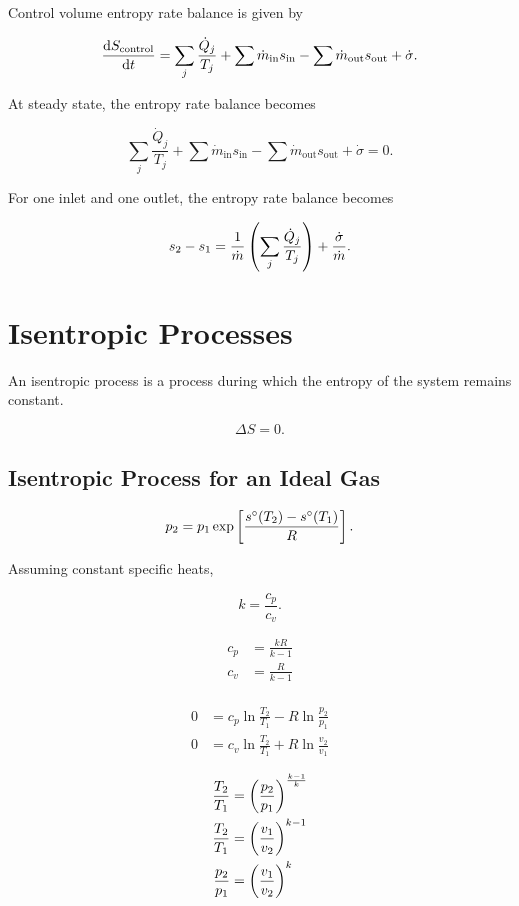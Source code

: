 \documentclass{report}
\begin{document}
Control volume entropy rate balance is given by

\[
	\dv{S_\text{control}}{t} = \sum_j \frac{\dot{Q}_j}{T_j} + \sum \dot{m}_\text{in} s_\text{in} - \sum \dot{m}_\text{out} s_\text{out} + \dot{\sigma}
	.\]

At steady state, the entropy rate balance becomes

\[
	\sum_j \frac{\dot{Q}_j}{T_j} + \sum \dot{m}_\text{in} s_\text{in} - \sum \dot{m}_\text{out} s_\text{out} + \dot{\sigma} = 0
	.\]

For one inlet and one outlet, the entropy rate balance becomes

\[
	s_2 - s_1 = \frac{1}{\dot{m}} \left( \sum_j \frac{\dot{Q}_j}{T_j} \right) + \frac{\dot{\sigma}}{\dot{m}}
	.\]

\section{Isentropic Processes}

An isentropic process is a process during which the entropy of the system remains constant.

\[
	\Delta S = 0
	.\]

\subsection{Isentropic Process for an Ideal Gas}

\[
	p_2 = p_1 \exp\left[ \frac{s^\circ(T_2) - s^\circ(T_1)}{R} \right]
	.\]

Assuming constant specific heats,

\[
	k = \frac{c_p}{c_v}
	.\]

\begin{align*}
	c_p & = \frac{kR}{k-1} \\
	c_v & = \frac{R}{k-1}  \\
\end{align*}

\begin{align*}
	0 & = c_p \ln\frac{T_2}{T_1} - R\ln\frac{p_2}{p_1} \\
	0 & = c_v \ln\frac{T_2}{T_1} + R\ln\frac{v_2}{v_1}
\end{align*}

\begin{align*}
	\frac{T_2}{T_1} & = \left(\frac{p_2}{p_1}\right)^{\frac{k-1}{k}} \\
	\frac{T_2}{T_1} & = \left(\frac{v_1}{v_2}\right)^{k-1}           \\
	\frac{p_2}{p_1} & = \left(\frac{v_1}{v_2}\right)^k
\end{align*}
\end{document}
